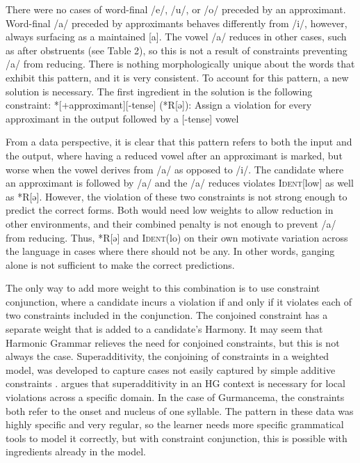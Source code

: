 \documentclass[output=paper,newtxmath,modfonts,nonflat,draftmode]{langsci/langscibook}
\begin{document}
There were no cases of word-final /e/, /u/, or /o/ preceded by an approximant. Word-final /a/ preceded by approximants behaves differently from /i/, 
however, always surfacing as a maintained [a]. The vowel /a/ reduces in other cases, such as after obstruents (see Table 2), so this is not a result of constraints preventing /a/ from reducing. There is nothing morphologically unique about the words that exhibit this pattern, and it is very consistent. To account for this pattern, a new solution is necessary. The first ingredient in the solution is the following constraint: 
\ea
*[+approximant][-tense] (*R[ə]): Assign a violation for every approximant in 	the output followed by a [-tense] vowel
\z

From a data perspective, it is clear that this pattern refers to both the input and the output, where having a reduced vowel after an approximant is marked, but worse when the vowel derives from /a/ as opposed to /i/. The candidate where an approximant is followed by /a/ and the /a/ reduces violates \textsc{Ident}[low] as well as *R[ə]. However, the violation of these two constraints is not strong enough to predict the correct forms. Both would need low weights to allow reduction in other environments, and their combined penalty is not enough to prevent /a/ from reducing. Thus, *R[ə] and \textsc{Ident}(lo) on their own motivate variation across the language in cases where there should not be any. In other words, ganging alone is not sufficient to make the correct predictions. 
	
The only way to add more weight to this combination is to use constraint conjunction, where a candidate incurs a violation if and only if it violates each of two constraints included in the conjunction. The conjoined constraint has a separate weight that is added to a candidate’s Harmony. It may seem that Harmonic Grammar relieves the need for conjoined constraints, but this is not always the case. Superadditivity, the conjoining of constraints in a weighted model, was developed to capture cases not easily captured by simple additive constraints \citep{AlbrightEtAl2008,GreenDavis2014}. \citet{Smolensky2006} argues that superadditivity in an HG context is necessary for local violations across a specific domain. In the case of Gurmancema, the constraints both refer to the onset and nucleus of one syllable. The pattern in these data was highly specific and very regular, so the learner needs more specific grammatical tools to model it correctly, but with constraint conjunction, this is possible with ingredients already in the model. 
\end{document}
